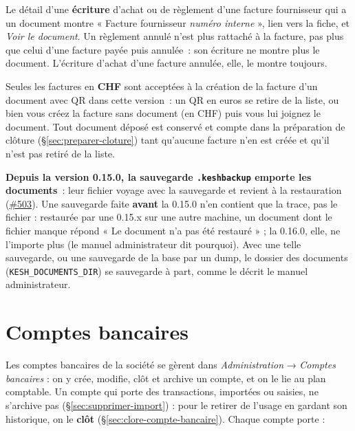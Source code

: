 \documentclass[a4paper,11pt,oneside]{article}
\begin{document}
Le détail d'une \textbf{écriture} d'achat ou de règlement d'une facture fournisseur qui a un
document montre « Facture fournisseur \emph{numéro interne} », lien vers la fiche, et \emph{Voir le
document}. Un règlement annulé n'est plus rattaché à la facture, pas plus que celui d'une
facture payée puis annulée~: son écriture ne montre plus le document. L'écriture d'achat
d'une facture annulée, elle, le montre toujours.

\begin{keshnote}
Seules les factures en \textbf{CHF} sont acceptées à la création de la facture d'un
document avec QR dans cette version~: un QR en euros se retire de la liste, ou bien vous
créez la facture sans document (en CHF) puis vous lui joignez le document. Tout document
déposé est conservé et compte dans la préparation de clôture (\S\ref{sec:preparer-cloture})
tant qu'aucune facture n'en est créée et qu'il n'est pas retiré de la liste.
\end{keshnote}

\begin{keshwarning}
\textbf{Depuis la version 0.15.0, la sauvegarde \texttt{.keshbackup} emporte les
documents}~: leur fichier voyage avec la sauvegarde et revient à la restauration
(\href{https://github.com/guycorbaz/kesh/issues/503}{\#503}). Une sauvegarde faite
\textbf{avant} la 0.15.0 n'en contient que la trace, pas le fichier : restaurée par une
0.15.x sur une autre machine, un document dont le fichier manque répond « Le document n'a
pas été restauré » ; la 0.16.0, elle, ne l'importe plus (le manuel administrateur dit
pourquoi). Avec une telle sauvegarde, ou une sauvegarde de la base par un dump, le
dossier des documents (\texttt{KESH\_DOCUMENTS\_DIR}) se sauvegarde à part, comme le décrit
le manuel administrateur.
\end{keshwarning}

\section{Comptes bancaires}\label{sec:comptes-bancaires}

Les comptes bancaires de la société se gèrent dans \emph{Administration} → \emph{Comptes bancaires} : on y crée, modifie, clôt et archive un compte, et on le lie au plan comptable. Un compte qui porte des transactions, importées ou saisies, ne s'archive pas (\S\ref{sec:supprimer-import}) : pour le retirer de l'usage en gardant son historique, on le \textbf{clôt} (\S\ref{sec:clore-compte-bancaire}). Chaque compte porte :
\end{document}
